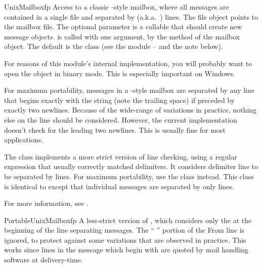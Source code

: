 \begin{classdesc}{UnixMailbox}{fp}
Access to a classic \UNIX-style mailbox, where all messages are
contained in a single file and separated by 
(a.k.a.\ ) lines.  The file object  points to the
mailbox file.  The optional  parameter is a callable that
should create new message objects.   is called with one
argument,  by the  method of the mailbox
object.  The default is the  class (see the
 module -- and the note below).

\begin{notice}
  For reasons of this module's internal implementation, you will
  probably want to open the  object in binary mode.  This is
  especially important on Windows.
\end{notice}

For maximum portability, messages in a \UNIX-style mailbox are
separated by any line that begins exactly with the string  (note the trailing space) if preceded by exactly two newlines.
Because of the wide-range of variations in practice, nothing else on
the  line should be considered.  However, the current
implementation doesn't check for the leading two newlines.  This is
usually fine for most applications.

The  class implements a more strict version of
 line checking, using a regular expression that usually correctly
matched  delimiters.  It considers delimiter line to be separated
by  lines.  For maximum portability,
use the  class instead.  This class is
identical to  except that individual messages are
separated by only  lines.

For more information, see
.
\end{classdesc}

\begin{classdesc}{PortableUnixMailbox}{fp}
A less-strict version of , which considers only the
 at the beginning of the line separating messages.  The
`` '' portion of the From line is ignored, to
protect against some variations that are observed in practice.  This
works since lines in the message which begin with  are
quoted by mail handling software at delivery-time.
\end{classdesc}

